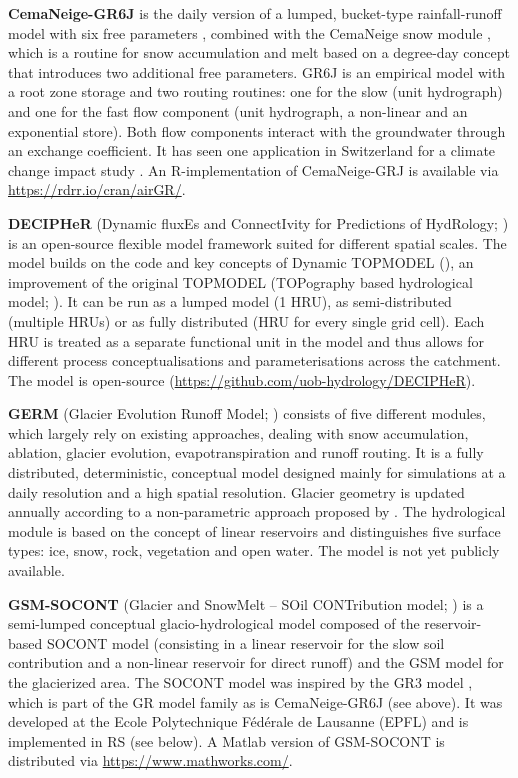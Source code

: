 \documentclass[10pt,a4paper]{article}
\begin{document}
\textbf{CemaNeige-GR6J} is the daily version of a lumped, bucket-type rainfall-runoff model with six free parameters \citep{Pushpalatha2011}, combined with the CemaNeige snow module \citep{Valery2014a, Valery2014b}, which is a routine for snow accumulation and melt based on a degree-day concept that introduces two additional free parameters. GR6J is an empirical model with a root zone storage and two routing routines: one for the slow (unit hydrograph) and one for the fast flow component ({unit hydrograph}, a non-linear and an exponential store). Both flow components interact with the groundwater through an exchange coefficient. It has seen one application in Switzerland for a climate change impact study \citep{Keller2019a}. An R-implementation of CemaNeige-GRJ is available via \url{https://rdrr.io/cran/airGR/}.

\textbf{DECIPHeR} (Dynamic fluxEs and ConnectIvity for Predictions of HydRology; \citealp{Coxon2019}) is an open-source flexible model framework suited for different spatial scales. The model builds on the code and key concepts of Dynamic TOPMODEL (\citealp{Beven2001}), an improvement of the original TOPMODEL (TOPography based hydrological model; \citealp{Beven1979}). It can be run as a lumped model (1 HRU), as semi-distributed (multiple HRUs) or as fully distributed (HRU for every single grid cell). Each HRU is treated as a separate functional unit in the model and thus allows for different process conceptualisations and parameterisations across the catchment. The model is open-source (\url{https://github.com/uob-hydrology/DECIPHeR}).

\textbf{GERM} (Glacier Evolution Runoff Model; \citealt{Huss2016, Farinotti2012}) consists of five different modules, which largely rely on existing approaches, dealing with snow accumulation, ablation, glacier evolution, evapotranspiration and runoff routing. It is a fully distributed, deterministic, conceptual model designed mainly for simulations at a daily resolution and a high spatial resolution. Glacier geometry is updated annually according to a non-parametric approach proposed by \citet{Huss2010}. The hydrological module is based on the concept of linear reservoirs and distinguishes five surface types: ice, snow, rock, vegetation and open water. The model is not yet publicly available.

\textbf{GSM-SOCONT} (Glacier and SnowMelt -- SOil CONTribution model; \citealp{Schaefli2005c}) is a semi-lumped conceptual glacio-hydrological model composed of the reservoir-based SOCONT model (consisting in a linear reservoir for the slow soil contribution and a non-linear reservoir for direct runoff) and the GSM model for the glacierized area. The SOCONT model was inspired by the GR3 model \citep{Edijatno1989}, which is part of the GR model family as is CemaNeige-GR6J (see above). It was developed at the Ecole Polytechnique Fédérale de Lausanne (EPFL) and is implemented in RS (see below). A Matlab version of GSM-SOCONT is distributed via \url{https://www.mathworks.com/}.
\end{document}
